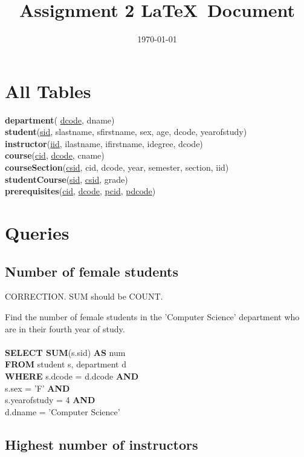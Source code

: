 \documentclass[11pt]{article}
\begin{document}
\title{Assignment 2 \LaTeX \ Document}
\date{\today}
\maketitle


\section{All Tables}
\textbf{department}( \underline{dcode}, dname)\\
\textbf{student}(\underline{sid}, slastname, sfirstname, sex, age, dcode, yearofstudy)\\
\textbf{instructor}(\underline{iid}, ilastname, ifirstname, idegree, dcode)\\
\textbf{course}(\underline{cid}, \underline{dcode},	cname)\\
\textbf{courseSection}(\underline{csid}, cid, dcode, year, semester, section, iid)\\
\textbf{studentCourse}(\underline{sid}, \underline{csid}, grade)\\
\textbf{prerequisites}(\underline{cid}, \underline{dcode}, \underline{pcid}, \underline{pdcode})

\section{Queries}

\subsection{Number of female students}

CORRECTION. SUM should be COUNT.

Find the number of female students in the 'Computer Science' department who are in their
fourth year of study.\\
~\\
\textbf{SELECT SUM}(s.sid) \textbf{AS} num\\
\textbf{FROM} student s, department d\\
\textbf{WHERE} s.dcode = d.dcode \textbf{AND}\\
s.sex = 'F' \textbf{AND}\\
s.yearofstudy = 4 \textbf{AND}\\
d.dname = 'Computer Science'

\subsection{Highest number of instructors}
\end{document}

